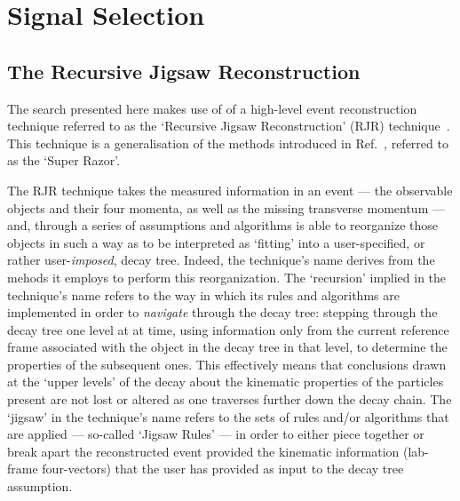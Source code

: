 \section{Signal Selection}
\label{sec:stop_strategy}

%
%
\subsection{The Recursive Jigsaw Reconstruction}
\label{sec:stop_rjr}

The \stopone search presented here makes use of of a high-level event reconstruction
technique referred to as the `Recursive Jigsaw Reconstruction' (RJR) technique~\cite{RecursiveJigsaw}.
This technique is a generalisation of the methods introduced in Ref.~\cite{SuperRazor}, referred
to as the `Super Razor'.

The RJR technique takes the measured information in an event --- the observable objects and their
four momenta, as well as the missing transverse momentum --- and, through a series of assumptions
and algorithms is able to reorganize those objects in such a way as to be interpreted as `fitting' into
a user-specified, or rather user-\textit{imposed}, decay tree.
Indeed, the technique's name derives from the mehods it employs to perform this reorganization.
The `recursion' implied in the technique's name refers to the way in which its rules and algorithms
are implemented in order to \textit{navigate} through the decay tree: stepping through the decay
tree one level at at time, using information only from the current reference frame associated with
the object in the decay tree in that level, to determine the properties of the subsequent ones.
This effectively means that conclusions drawn at the `upper levels' of the decay about the kinematic
properties of the particles present are not lost or altered as one traverses further down the decay chain.
The `jigsaw' in the technique's name refers to the sets of rules and/or algorithms that are applied ---
so-called `Jigsaw Rules' --- in order to either piece together or break apart the reconstructed
event provided the kinematic information (lab-frame four-vectors) that the user has provided as input
to the decay tree assumption.

